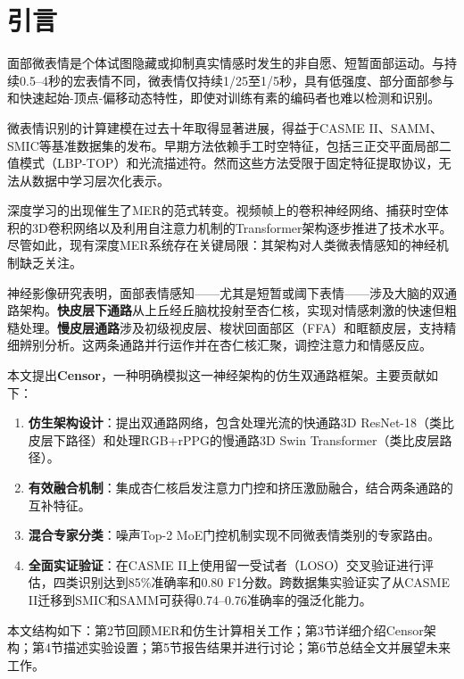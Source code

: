 
\section{引言}

面部微表情是个体试图隐藏或抑制真实情感时发生的非自愿、短暂面部运动\cite{ekman1969nonverbal}。与持续0.5--4秒的宏表情不同，微表情仅持续1/25至1/5秒\cite{ekman2003darwin}，具有低强度、部分面部参与和快速起始-顶点-偏移动态特性，即使对训练有素的编码者也难以检测和识别\cite{frank2009training}。

微表情识别的计算建模在过去十年取得显著进展，得益于CASME II\cite{yan2014casme2}、SAMM\cite{yap2018samm}、SMIC\cite{li2013smic}等基准数据集的发布。早期方法依赖手工时空特征，包括三正交平面局部二值模式（LBP-TOP）\cite{zhao2007lbptop}和光流描述符\cite{wang2015offapexnet}。然而这些方法受限于固定特征提取协议，无法从数据中学习层次化表示。

深度学习的出现催生了MER的范式转变。视频帧上的卷积神经网络、捕获时空体积的3D卷积网络\cite{tran2015c3d}以及利用自注意力机制的Transformer架构\cite{liu2022videoSwin}逐步推进了技术水平。尽管如此，现有深度MER系统存在关键局限：其架构对人类微表情感知的神经机制缺乏关注。

神经影像研究表明，面部表情感知——尤其是短暂或阈下表情——涉及大脑的双通路架构\cite{morris1999amygdala}。\textbf{快皮层下通路}从上丘经丘脑枕投射至杏仁核，实现对情感刺激的快速但粗糙处理。\textbf{慢皮层通路}涉及初级视皮层、梭状回面部区（FFA）和眶额皮层，支持精细辨别分析\cite{kanwisher1997ffa}。这两条通路并行运作并在杏仁核汇聚，调控注意力和情感反应。

本文提出\textbf{Censor}，一种明确模拟这一神经架构的仿生双通路框架。主要贡献如下：

\begin{enumerate}
\item \textbf{仿生架构设计}：提出双通路网络，包含处理光流的快通路3D ResNet-18（类比皮层下路径）和处理RGB+rPPG的慢通路3D Swin Transformer（类比皮层路径）。

\item \textbf{有效融合机制}：集成杏仁核启发注意力门控和挤压激励融合，结合两条通路的互补特征。

\item \textbf{混合专家分类}：噪声Top-2 MoE门控机制实现不同微表情类别的专家路由。

\item \textbf{全面实证验证}：在CASME II上使用留一受试者（LOSO）交叉验证进行评估，四类识别达到85\%准确率和0.80 F1分数。跨数据集实验证实了从CASME II迁移到SMIC和SAMM可获得0.74--0.76准确率的强泛化能力。
\end{enumerate}

本文结构如下：第2节回顾MER和仿生计算相关工作；第3节详细介绍Censor架构；第4节描述实验设置；第5节报告结果并进行讨论；第6节总结全文并展望未来工作。